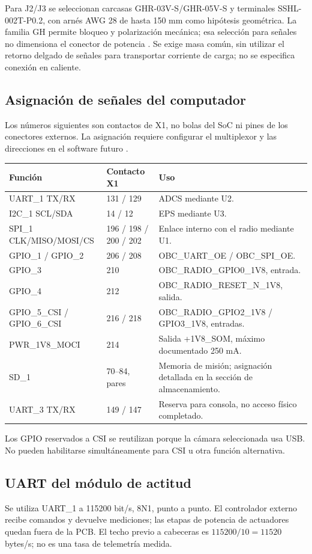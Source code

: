 \documentclass[11pt,letterpaper]{article}
\begin{document}
Para J2/J3 se seleccionan carcasas GHR-03V-S/GHR-05V-S y terminales SSHL-002T-P0.2, con arnés AWG 28 de hasta 150 mm como hipótesis geométrica. La familia GH permite bloqueo y polarización mecánica; esa selección para señales no dimensiona el conector de potencia \cite{jstgh}. Se exige masa común, sin utilizar el retorno delgado de señales para transportar corriente de carga; no se especifica conexión en caliente.

\subsection{Asignación de señales del computador}
Los números siguientes son contactos de X1, no bolas del SoC ni pines de los conectores externos. La asignación requiere configurar el multiplexor y las direcciones en el software futuro \cite{verdinds}.
\begin{longtable}{L{3.1cm}L{2.1cm}L{8.4cm}}
\toprule Función & Contacto X1 & Uso \\
\midrule\endhead
UART\_1 TX/RX & 131 / 129 & ADCS mediante U2. \\
I2C\_1 SCL/SDA & 14 / 12 & EPS mediante U3. \\
SPI\_1 CLK/MISO/MOSI/CS & 196 / 198 / 200 / 202 & Enlace interno con el radio mediante U1. \\
GPIO\_1 / GPIO\_2 & 206 / 208 & OBC\_UART\_OE / OBC\_SPI\_OE. \\
GPIO\_3 & 210 & OBC\_RADIO\_GPIO0\_1V8, entrada. \\
GPIO\_4 & 212 & OBC\_RADIO\_RESET\_N\_1V8, salida. \\
GPIO\_5\_CSI / GPIO\_6\_CSI & 216 / 218 & OBC\_RADIO\_GPIO2\_1V8 / GPIO3\_1V8, entradas. \\
PWR\_1V8\_MOCI & 214 & Salida +1V8\_SOM, máximo documentado 250 mA. \\
SD\_1 & 70--84, pares & Memoria de misión; asignación detallada en la sección de almacenamiento. \\
UART\_3 TX/RX & 149 / 147 & Reserva para consola, no acceso físico completado. \\
\bottomrule
\end{longtable}
Los GPIO reservados a CSI se reutilizan porque la cámara seleccionada usa USB. No pueden habilitarse simultáneamente para CSI u otra función alternativa.

\subsection{UART del módulo de actitud}
Se utiliza UART\_1 a 115200 bit/s, 8N1, punto a punto. El controlador externo recibe comandos y devuelve mediciones; las etapas de potencia de actuadores quedan fuera de la PCB. El techo previo a cabeceras es $115200/10=11520$ bytes/s; no es una tasa de telemetría medida.
\end{document}
